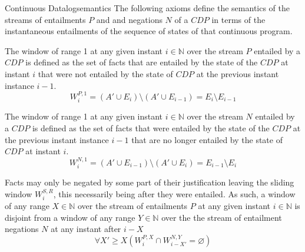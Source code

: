 \begin{nestedsection}{Continuous Datalog}{semantics}
	The following axioms define the semantics of the streams of entailments $P$ and and negations $N$ of a ${CDP}$ in terms of the instantaneous entailments of the sequence of states of that continuous program.

	\begin{axiom}\label{axiom:continuous datalog: positive window increment}
		The window of range 1 at any given instant ${i \in \mathbb{N}}$ over the stream $P$ entailed by a ${CDP}$ is defined as the set of facts that are entailed by the state of the ${CDP}$ at instant $i$ that were not entailed by the state of ${CDP}$ at the previous instant instance ${i-1}$.
		\begin{equation*}
			W^{P,1}_{i} = \left( A' \cup E_{i} \right) \setminus \left( A' \cup E_{i-1} \right) = E_{i} \setminus E_{i-1}
		\end{equation*}
	\end{axiom}

	\begin{axiom}\label{axiom:continuous datalog: negative window increment}
		The window of range 1 at any given instant ${i \in \mathbb{N}}$ over the stream $N$ entailed by a ${CDP}$ is defined as the set of facts that were entailed by the state of the ${CDP}$ at the previous instant instance ${i-1}$ that are no longer entailed by the state of ${CDP}$ at instant $i$.
		\begin{equation*}
			W^{N,1}_{i} = \left( A' \cup E_{i-1} \right) \setminus \left( A' \cup E_{i} \right) = E_{i-1} \setminus E_{i}
		\end{equation*}
	\end{axiom}

	\begin{axiom}\label{axiom:continuous datalog: entailment precedes negation}
		Facts may only be negated by some part of their justification leaving the sliding window $W^{S,R}_{i}$, this necessarily being after they were entailed.
		As such, a window of any range ${X \in \mathbb{N}}$ over the stream of entailments $P$ at any given instant ${i \in \mathbb{N}}$ is disjoint from a window of any range ${Y \in \mathbb{N}}$ over the the stream of entailment negations $N$ at any instant after ${i - X}$
		\begin{equation*}
			\forall X' \geq X \left( W^{P,X}_{i} \cap W^{N,Y}_{i-X'} = \varnothing \right)
		\end{equation*}
	\end{axiom}


\end{nestedsection}

